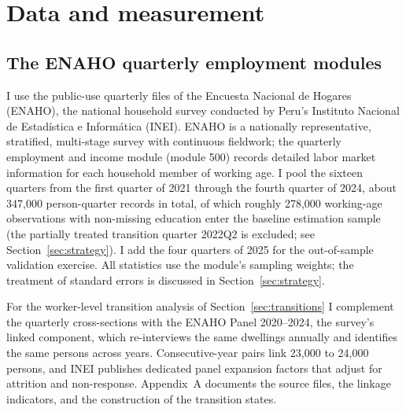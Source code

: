 \section{Data and measurement}\label{sec:data}

\subsection{The ENAHO quarterly employment modules}

I use the public-use quarterly files of the Encuesta Nacional de Hogares (ENAHO),
the national household survey conducted by Peru's Instituto Nacional de Estadística
e Informática (INEI). ENAHO is a nationally representative, stratified,
multi-stage survey with continuous fieldwork; the quarterly employment and income
module (module 500) records detailed labor market information for each household
member of working age. I pool the sixteen quarters from the first quarter of 2021
through the fourth quarter of 2024, about 347,000 person-quarter records in total, of
which roughly 278,000 working-age observations with non-missing education enter the
baseline estimation sample (the partially treated transition quarter 2022Q2 is
excluded; see Section~\ref{sec:strategy}). I add the four quarters of 2025 for the
out-of-sample validation exercise. All statistics use the module's sampling weights;
the treatment of standard errors is discussed in Section~\ref{sec:strategy}.

For the worker-level transition analysis of Section~\ref{sec:transitions} I
complement the quarterly cross-sections with the ENAHO Panel 2020--2024, the
survey's linked component, which re-interviews the same dwellings annually and
identifies the same persons across years. Consecutive-year pairs link 23,000 to
24,000 persons, and INEI publishes dedicated panel expansion factors that adjust
for attrition and non-response. Appendix~A documents the source files, the
linkage indicators, and the construction of the transition states.

